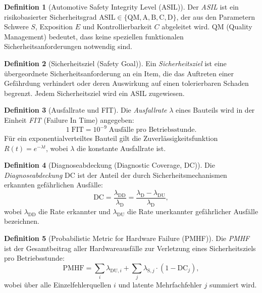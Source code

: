﻿\documentclass[a4paper,12pt]{article}
\theoremstyle{definition}
\newtheorem{definition}{Definition}
\begin{document}
\begin{definition}[Automotive Safety Integrity Level (ASIL)]
  Der \emph{ASIL} ist ein risikobasierter Sicherheitsgrad
  $\mathrm{ASIL} \in \{\text{QM}, \text{A}, \text{B}, \text{C}, \text{D}\}$,
  der aus den Parametern Schwere $S$, Exposition $E$ und
  Kontrollierbarkeit $C$ abgeleitet wird.
  $\mathrm{QM}$ (Quality Management) bedeutet, dass keine speziellen
  funktionalen Sicherheitsanforderungen notwendig sind.
\end{definition}

\begin{definition}[Sicherheitsziel (Safety Goal)]
  Ein \emph{Sicherheitsziel} ist eine übergeordnete Sicherheitsanforderung
  an ein Item, die das Auftreten einer Gefährdung verhindert oder deren
  Auswirkung auf einen tolerierbaren Schaden begrenzt.
  Jedem Sicherheitsziel wird ein ASIL zugewiesen.
\end{definition}

\begin{definition}[Ausfallrate und FIT]
  Die \emph{Ausfallrate} $\lambda$ eines Bauteils wird in der Einheit
  \emph{FIT} (Failure In Time) angegeben:
  \[
    1\;\mathrm{FIT} = 10^{-9}\;\text{Ausfälle pro Betriebsstunde.}
  \]
  Für ein exponentialverteiltes Bauteil gilt die Zuverlässigkeitsfunktion
  $R(t) = e^{-\lambda t}$, wobei $\lambda$ die konstante Ausfallrate ist.
\end{definition}

\begin{definition}[Diagnoseabdeckung (Diagnostic Coverage, DC)]
  Die \emph{Diagnoseabdeckung} $\mathrm{DC}$ ist der Anteil der durch
  Sicherheitsmechanismen erkannten gefährlichen Ausfälle:
  \[
    \mathrm{DC}
    = \frac{\lambda_{\mathrm{DD}}}{\lambda_{\mathrm{D}}}
    = \frac{\lambda_{\mathrm{D}} - \lambda_{\mathrm{DU}}}{\lambda_{\mathrm{D}}},
  \]
  wobei $\lambda_{\mathrm{DD}}$ die Rate erkannter und
  $\lambda_{\mathrm{DU}}$ die Rate unerkannter gefährlicher Ausfälle
  bezeichnen.
\end{definition}

\begin{definition}[Probabilistic Metric for Hardware Failure (PMHF)]
  Die \emph{PMHF} ist der Gesamtbeitrag aller Hardwareausfälle zur
  Verletzung eines Sicherheitsziels pro Betriebsstunde:
  \[
    \mathrm{PMHF}
    = \sum_{i} \lambda_{\mathrm{DU},i}
    + \sum_{j} \lambda_{\mathrm{S},j} \cdot (1 - \mathrm{DC}_j),
  \]
  wobei über alle Einzelfehlerquellen $i$ und latente Mehrfachfehler
  $j$ summiert wird.
\end{definition}
\end{document}
